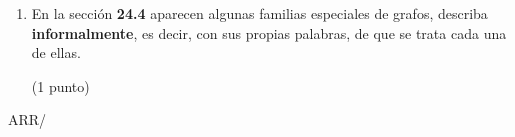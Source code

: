 \documentclass[spanish, fleqn]{article}
\begin{document}
\begin{enumerate}
\hspace*{\fill}(2 puntos)  

\item En la sección \textbf{24.4} aparecen algunas familias especiales de grafos, describa \textbf{informalmente}, es decir, con sus propias palabras, de que se trata cada una de ellas.

\hspace*{\fill}(1 punto)  
\end{enumerate}




  \vfill\hfill ARR/\LaTeXe
\end{document}
